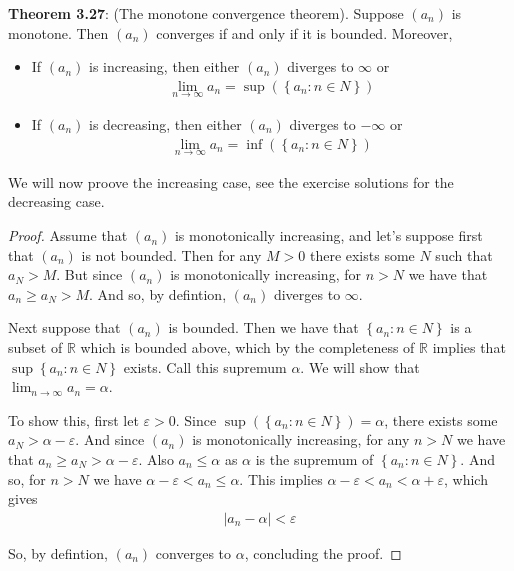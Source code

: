 \documentclass{article}
\begin{document}
\textbf{Theorem 3.27}: (The monotone convergence theorem). Suppose $(a_n)$ is monotone. Then $(a_n)$ converges if
and only if it is bounded. Moreover,
\begin{itemize}
	\item If $(a_n)$ is increasing, then either $(a_n)$ diverges to $\infty$ or
	      \begin{align*}
		      \lim_{n \rightarrow \infty} a_n = \sup\left(\left\{a_n : n \in N\right\}\right)
	      \end{align*}
	\item If $(a_n)$ is decreasing, then either $(a_n)$ diverges to $-\infty$ or
	      \begin{align*}
		      \lim_{n \rightarrow \infty} a_n = \inf\left(\left\{a_n : n \in N\right\}\right)
	      \end{align*}
\end{itemize}
We will now proove the increasing case, see the exercise solutions for the decreasing case.
\begin{proof}
	Assume that $(a_n)$ is monotonically increasing, and let's suppose first that $(a_n)$ is not bounded. Then for any $M > 0$
	there exists some $N$ such that $a_N > M$. But since $(a_n)$ is monotonically increasing, for $n > N$ we have that $a_n \ge a_{N} > M$.
	And so, by defintion, $(a_n)$ diverges to $\infty$.

	Next suppose that $(a_n)$ is bounded. Then we have that $\left\{a_n : n \in N\right\}$ is a subset of $\mathbb{R}$ which is bounded above,
	which by the completeness of $\mathbb{R}$ implies that $\sup\left\{a_n : n \in N\right\}$ exists. Call this supremum $\alpha$. We will show
	that $\lim_{n \rightarrow \infty} a_n = \alpha$.

	To show this, first let $\varepsilon > 0$. Since $\sup\left(\left\{a_n : n \in N\right\}\right) = \alpha$, there exists some
	$a_N > \alpha - \varepsilon$. And since $(a_n)$ is monotonically increasing, for any $n > N$ we have that $a_n \ge a_N > \alpha - \varepsilon$.
	Also $a_n \le \alpha$ as $\alpha$ is the supremum of $\left\{a_n : n \in N\right\}$. And so, for $n > N$ we have $\alpha - \varepsilon < a_n \le \alpha$.
	This implies $\alpha - \varepsilon < a_n < \alpha + \varepsilon$, which gives
	\begin{align*}
		|a_n - \alpha| < \varepsilon
	\end{align*}

	So, by defintion, $(a_n)$ converges to $\alpha$, concluding the proof.
\end{proof}
\end{document}
